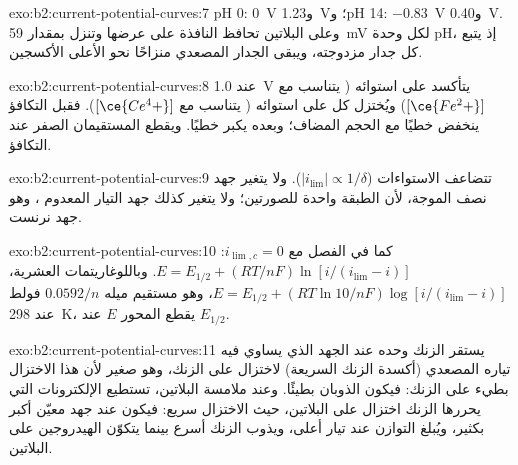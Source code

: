 \begin{solution}{exo:b2:current-potential-curves:7}
pH 0: \qty{0}{V} و\qty{1.23}{V}؛ وpH 14: \qty{-0.83}{V} و\qty{0.40}{V}. وعلى
البلاتين تحافظ النافذة على عرضها وتنزل بمقدار \qty{59}{mV} لكل وحدة pH،
إذ يتبع كل جدار مزدوجته، ويبقى الجدار المصعدي منزاحًا نحو الأعلى  الأكسجين.
\end{solution}

\begin{solution}{exo:b2:current-potential-curves:8}
عند \qty{1.0}{V} يتأكسد  على استوائه (
يتناسب مع $[\ce{Fe^2+}]$) ويُختزل كل  على استوائه
( يتناسب مع $[\ce{Ce^4+}]$). فقبل التكافؤ ينخفض  خطيًا مع الحجم المضاف؛ وبعده يكبر 
خطيًا. ويقطع المستقيمان الصفر عند التكافؤ.
\end{solution}

\begin{solution}{exo:b2:current-potential-curves:9}
تتضاعف الاستواءات ($|i_{\lim}| \propto 1/\delta$). ولا يتغير جهد نصف الموجة،
لأن الطبقة واحدة للصورتين؛ ولا يتغير كذلك جهد التيار المعدوم
، وهو جهد نرنست.
\end{solution}

\begin{solution}{exo:b2:current-potential-curves:10}
كما في الفصل مع $i_{\lim,c} = 0$: $E = E_{1/2} + (RT/nF)\ln[i/(i_{\lim} -
i)]$. وباللوغاريتمات العشرية، $E = E_{1/2} + (RT\ln 10/nF)\log[i/(i_{\lim} - i)]$،
وهو مستقيم ميله $0.0592/n$ فولط عند \qty{298}{K}، يقطع
المحور $E$ عند $E_{1/2}$.
\end{solution}

\begin{solution}{exo:b2:current-potential-curves:11}
يستقر الزنك وحده عند الجهد الذي يساوي فيه تياره المصعدي (أكسدة الزنك
السريعة)  لاختزال  على الزنك،
وهو صغير لأن هذا الاختزال بطيء على الزنك: فيكون الذوبان
بطيئًا. وعند ملامسة البلاتين، تستطيع الإلكترونات التي يحررها الزنك اختزال 
على البلاتين، حيث الاختزال سريع: فيكون  عند جهد معيّن
أكبر بكثير، ويُبلغ التوازن عند تيار أعلى، ويذوب
الزنك أسرع بينما يتكوّن الهيدروجين على البلاتين.
\end{solution}

